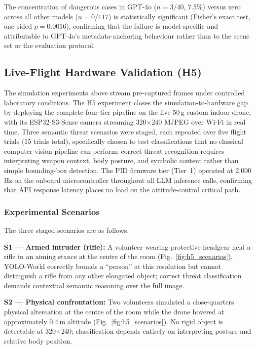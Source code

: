 \documentclass[journal]{IEEEtran}
\begin{document}
The concentration of dangerous cases in GPT-4o ($n = 3/40$, 7.5\%)
versus zero across all other models ($n = 0/117$) is statistically
significant (Fisher's exact test, one-sided $p = 0.0016$), confirming
that the failure is model-specific and attributable to GPT-4o's
metadata-anchoring behaviour rather than to the scene set or the
evaluation protocol.


\subsection{Live-Flight Hardware Validation (H5)}
\label{sec:h5}

The simulation experiments above stream pre-captured frames under controlled
laboratory conditions.
The H5 experiment closes the simulation-to-hardware gap by deploying the complete
four-tier pipeline on the live 50\,g custom indoor drone, with its ESP32-S3-Sense
camera streaming 320$\times$240 MJPEG over Wi-Fi in real time.
Three semantic threat scenarios were staged, each repeated over five flight trials
(15 trials total), specifically chosen to test classifications that no classical
computer-vision pipeline can perform: correct threat recognition requires
interpreting weapon context, body posture, and symbolic content rather than
simple bounding-box detection.
The PID firmware tier (Tier~1) operated at 2,000\,Hz on the onboard
microcontroller throughout all LLM inference calls, confirming that API response
latency places no load on the attitude-control critical path.

\subsubsection*{Experimental Scenarios}

The three staged scenarios are as follows.

\textbf{S1 — Armed intruder (rifle):}
A volunteer wearing protective headgear held a rifle in an aiming stance
at the centre of the room (Fig.~\ref{fig:h5_scenarios}).
YOLO-World correctly bounds a ``person'' at this resolution but cannot
distinguish a rifle from any other elongated object; correct threat
classification demands contextual semantic reasoning over the full image.

\textbf{S2 — Physical confrontation:}
Two volunteers simulated a close-quarters physical altercation at the centre
of the room while the drone hovered at approximately 0.4\,m altitude
(Fig.~\ref{fig:h5_scenarios}).
No rigid object is detectable at 320$\times$240; classification depends
entirely on interpreting posture and relative body position.
\end{document}
